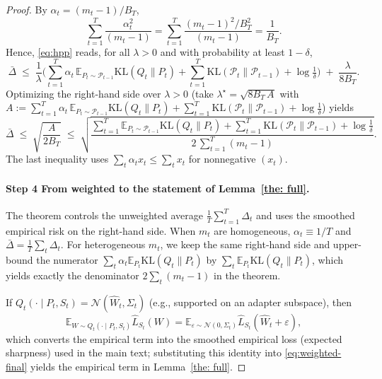 \documentclass{article}
\theoremstyle{plain}
\theoremstyle{definition}
\theoremstyle{remark}
\begin{document}
\begin{proof}

By $\alpha_t=(m_t-1)/B_T$,
\[
\sum_{t=1}^T \frac{\alpha_t^2}{(m_t-1)}
=\sum_{t=1}^T \frac{(m_t-1)^2/B_T^2}{(m_t-1)}
=\frac{1}{B_T}.
\]
Hence, \eqref{eq:hpp} reads, for all $\lambda>0$ and with probability at least $1-\delta$,
\begin{equation}
\label{eq:gap-preopt}
\bar\Delta
\;\le\;
\frac{1}{\lambda}\Big(
\sum_{t=1}^T \alpha_t\,\mathbb E_{P_t\sim\mathcal P_{t-1}}\mathrm{KL}(Q_t\|P_t)
+ \sum_{t=1}^T \mathrm{KL}(\mathcal P_t\|\mathcal P_{t-1})
+ \log\tfrac1\delta\Big)
\;+\;
\frac{\lambda}{8B_T}.
\end{equation}
Optimizing the right-hand side over $\lambda>0$ (take $\lambda^\star=\sqrt{8B_T\,A}$ with
$A:=\sum_{t=1}^T \alpha_t\,\mathbb E_{P_t\sim\mathcal P_{t-1}}\mathrm{KL}(Q_t\|P_t)
+ \sum_{t=1}^T \mathrm{KL}(\mathcal P_t\|\mathcal P_{t-1}) + \log\tfrac1\delta$) yields
\begin{equation}
\label{eq:weighted-final}
\bar\Delta
\;\le\;
\sqrt{\frac{A}{2B_T}}
\;\le\;
\sqrt{\frac{
\sum_{t=1}^T \mathbb E_{P_t\sim\mathcal P_{t-1}}\mathrm{KL}(Q_t\|P_t)
+ \sum_{t=1}^T \mathrm{KL}(\mathcal P_t\|\mathcal P_{t-1})
+ \log\tfrac1\delta}{2\,\sum_{t=1}^T (m_t-1)}}.
\end{equation}
The last inequality uses $\sum_t \alpha_t x_t \le \sum_t x_t$ for nonnegative $(x_t)$.

\paragraph{Step 4 From weighted to the statement of Lemma~\ref{the: full}.}
The theorem controls the unweighted average $\frac1T\sum_{t=1}^T \Delta_t$ and uses the smoothed empirical risk on the right-hand side.
When $m_t$ are homogeneous, $\alpha_t\equiv 1/T$ and $\bar\Delta=\frac1T\sum_t\Delta_t$.
For heterogeneous $m_t$, we keep the same right-hand side and upper-bound the numerator $\sum_t \alpha_t \mathbb E_{P_t}\mathrm{KL}(Q_t\|P_t)$ by $\sum_t \mathbb E_{P_t}\mathrm{KL}(Q_t\|P_t)$, which yields exactly the denominator $2\sum_t(m_t-1)$ in the theorem.


If $Q_t(\cdot\mid P_t,S_t)=\mathcal N(\hat W_t,\Sigma_t)$ (e.g., supported on an adapter subspace), then
\[
\mathbb E_{W\sim Q_t(\cdot\mid P_t,S_t)}\hat L_{S_t}(W)
=\mathbb E_{\varepsilon\sim\mathcal N(0,\Sigma_t)}\hat L_{S_t}(\hat W_t+\varepsilon),
\]
which converts the empirical term into the smoothed empirical loss (expected sharpness) used in the main text; substituting this identity into \eqref{eq:weighted-final} yields the empirical term in Lemma~\ref{the: full}.

\end{proof}
\end{document}
